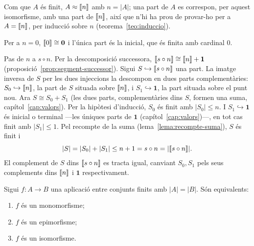 \begin{prova}
Com que \(A\) és finit, \(A\approx\llbracket n\rrbracket\) amb \(n=|A|\); una part de
\(A\) es correspon, per aquest isomorfisme, amb una part de \(\llbracket n\rrbracket\),
així que n'hi ha prou de provar-ho per a \(A=\llbracket n\rrbracket\), per inducció sobre
\(n\) (teorema~\ref{teo:induccio}).

Per a \(n=0\), \(\llbracket 0\rrbracket\cong\mathbf0\) i l'única part és la inicial, que
és finita amb cardinal \(0\).

Pas de \(n\) a \(s\circ n\). Per la descomposició successora,
\(\llbracket s\circ n\rrbracket\cong\llbracket n\rrbracket+\mathbf1\)
(proposició~\ref{prop:segment-successor}). Sigui \(S\hookrightarrow
\llbracket s\circ n\rrbracket\) una part. La imatge inversa de \(S\) per les dues
injeccions la descompon en dues parts complementàries: \(S_0\hookrightarrow
\llbracket n\rrbracket\), la part de \(S\) situada sobre \(\llbracket n\rrbracket\), i \(S_1\hookrightarrow
\mathbf1\), la part situada sobre el punt nou. Ara \(S\cong S_0+S_1\)
(les dues parts, complementàries dins \(S\), formen una suma,
capítol~\ref{cap:valors}). Per la hipòtesi d'inducció, \(S_0\) és finit amb
\(|S_0|\le n\). I \(S_1\hookrightarrow\mathbf1\) és inicial o terminal
---les úniques parts de \(\mathbf1\) (capítol~\ref{cap:valors})---, en tot
cas finit amb \(|S_1|\le1\). Pel recompte de la suma
(lema~\ref{lema:recompte-suma}), \(S\) és finit i
\[
|S|=|S_0|+|S_1|\le n+1=s\circ n=|\llbracket s\circ n\rrbracket| .
\]
El complement de \(S\) dins \(\llbracket s\circ n\rrbracket\) es tracta igual, canviant
\(S_0,S_1\) pels seus complements dins \(\llbracket n\rrbracket\) i \(\mathbf1\)
respectivament.
\end{prova}

\begin{teorema}\label{teo:endo-finit}
Sigui \(f\colon A\to B\) una aplicació entre conjunts finits amb
\(|A|=|B|\). Són equivalents:
\begin{enumerate}
\item \(f\) és un monomorfisme;
\item \(f\) és un epimorfisme;
\item \(f\) és un isomorfisme.
\end{enumerate}
\end{teorema}

